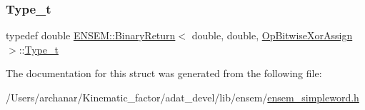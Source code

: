 \mbox{\label{structENSEM_1_1BinaryReturn_3_01double_00_01double_00_01OpBitwiseXorAssign_01_4_abd2a3f0619e394d328f98f130fc26e87}} 
\subsubsection{\texorpdfstring{Type\_t}{Type\_t}\hspace{0.1cm}{\footnotesize\ttfamily [2/2]}}
{\footnotesize\ttfamily typedef double \mbox{\hyperlink{structENSEM_1_1BinaryReturn}{E\+N\+S\+E\+M\+::\+Binary\+Return}}$<$ double, double, \mbox{\hyperlink{structENSEM_1_1OpBitwiseXorAssign}{Op\+Bitwise\+Xor\+Assign}} $>$\+::\mbox{\hyperlink{structENSEM_1_1BinaryReturn_3_01double_00_01double_00_01OpBitwiseXorAssign_01_4_abd2a3f0619e394d328f98f130fc26e87}{Type\+\_\+t}}}



The documentation for this struct was generated from the following file\+:\begin{DoxyCompactItemize}
\item 
/\+Users/archanar/\+Kinematic\+\_\+factor/adat\+\_\+devel/lib/ensem/\mbox{\hyperlink{lib_2ensem_2ensem__simpleword_8h}{ensem\+\_\+simpleword.\+h}}\end{DoxyCompactItemize}
